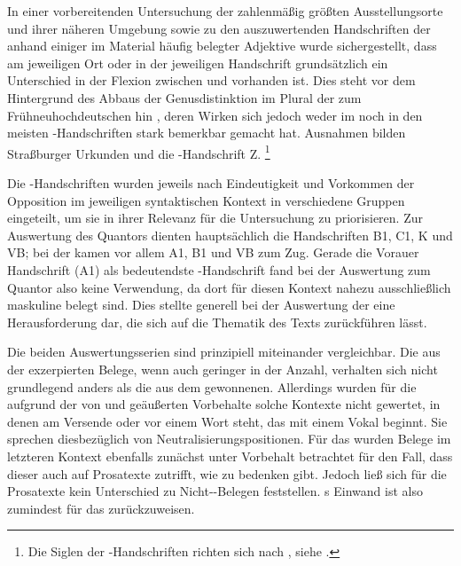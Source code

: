 In einer vorbereitenden Untersuchung der zahlenmäßig größten Ausstellungs\-orte
und ihrer näheren Umgebung sowie zu den auszuwertenden Handschriften der
\KC{} anhand einiger im Material häufig belegter Adjektive wurde
sichergestellt, dass am jeweiligen Ort oder in der jeweiligen Handschrift
grundsätzlich ein Unterschied in der Flexion zwischen  und
 vorhanden ist. Dies steht vor dem Hintergrund des Abbaus der
Genusdistinktion im Plural der  zum
Frühneuhochdeutschen hin
\autocite[191--192]{reichmannwegera1993}, deren Wirken sich jedoch weder im
\CAO{} noch in den meisten \KC-Handschriften stark bemerkbar gemacht hat.
Ausnahmen bilden Straßburger Urkunden und die \KC{}-Handschrift Z.%
%
	\footnote{Die Siglen der \KC-Handschriften richten sich nach
		, siehe .}

Die \KC{}-Handschriften wurden jeweils nach Eindeutigkeit und Vorkommen der
Opposition im jeweiligen syntaktischen Kontext in verschiedene Gruppen
eingeteilt, um sie in ihrer Relevanz für die Untersuchung zu priorisieren. Zur
Auswertung des Quantors  dienten hauptsächlich die Handschriften
B1, C1, K und VB; bei der   kamen vor allem A1, B1
und VB zum Zug. Gerade die Vorauer Handschrift (A1) als bedeutendste
\KC{}-Handschrift fand bei der Auswertung zum Quantor  also keine
Verwendung, da dort für diesen Kontext nahezu ausschließlich maskuline
 belegt sind. Dies stellte generell bei der Auswertung der
\KC{} eine Herausforderung dar, die sich auf die Thematik des Texts
zurückführen lässt.

Die beiden Auswertungsserien sind prinzipiell miteinander vergleichbar. Die aus
der \KC{} exzerpierten Belege, wenn auch geringer in der Anzahl, verhalten sich
nicht grundlegend anders als die aus dem \CAO{} gewonnenen. Allerdings wurden
für die \KC{} aufgrund der von \citet[89--90]{askedal1973} und
\citet[191]{gjelsten1980} geäußerten Vorbehalte solche Kontexte nicht gewertet,
in denen  am Versende oder vor einem Wort steht, das mit einem
Vokal beginnt. Sie sprechen diesbezüglich von Neutralisierungs\-positionen. Für
das \CAO{} wurden Belege im letzteren Kontext ebenfalls zunächst unter
Vorbehalt betrachtet für den Fall, dass dieser auch auf Prosatexte
zutrifft, wie \citet[92]{askedal1973} zu bedenken gibt. Jedoch ließ sich für
die Prosatexte kein Unterschied zu
Nicht-\allowbreak{}-\allowbreak{}Belegen feststellen.
\citeauthor{askedal1973}s Einwand ist also zumindest für das \CAO{}
zurückzuweisen.

